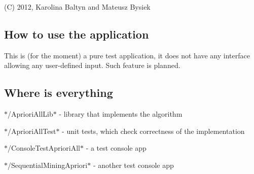 (C) 2012, Karolina Baltyn and Mateusz Bysiek

\subsection*{How to use the application}

This is (for the moment) a pure test application, it does not have any interface allowing any user-\/defined input. Such feature is planned.

\subsection*{Where is everything}


\begin{DoxyItemize}
\item $\ast$/\-Apriori\-All\-Lib$\ast$ -\/ library that implements the algorithm
\item $\ast$/\-Apriori\-All\-Test$\ast$ -\/ unit tests, which check correctness of the implementation
\item $\ast$/\-Console\-Test\-Apriori\-All$\ast$ -\/ a test console app
\item $\ast$/\-Sequential\-Mining\-Apriori$\ast$ -\/ another test console app 
\end{DoxyItemize}